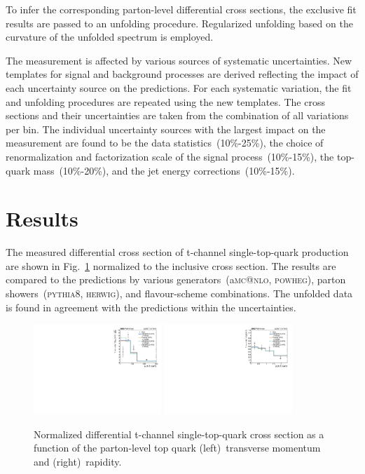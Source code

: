 \documentclass[12pt]{article}
\begin{document}
To infer the corresponding parton-level differential cross sections, the exclusive fit results are passed to an unfolding procedure. Regularized unfolding based on the curvature of the unfolded spectrum is employed. 

The measurement is affected by various sources of systematic uncertainties. New templates for signal and background processes are derived reflecting the impact of each uncertainty source on the predictions. For each systematic variation, the fit and unfolding procedures are repeated using the new templates. The cross sections and their uncertainties are taken from the combination of all variations per bin. The individual uncertainty sources with the largest impact on the measurement are found to be the data statistics~(10\%-25\%), the choice of renormalization and factorization scale of the signal process~(10\%-15\%), the top-quark mass~(10\%-20\%), and the jet energy corrections~(10\%-15\%).

\section{Results}

The measured differential cross section of t-channel single-top-quark production are shown in Fig.~\ref{fig:result} normalized to the inclusive cross section. The results are compared to the predictions by various generators~(a\textsc{mc@nlo}, \textsc{powheg}), parton showers~(\textsc{pythia}8, \textsc{herwig}), and flavour-scheme combinations. The unfolded data is found in agreement with the predictions within the uncertainties.

\begin{figure}[!htbp]
\begin{center}
\includegraphics[width=0.43\textwidth]{unfolded_top_pt.pdf}\hspace{0.05\textwidth}
\includegraphics[width=0.43\textwidth]{unfolded_top_y.pdf}
\end{center}

\caption{\label{fig:result}Normalized differential t-channel single-top-quark cross section as a function of the parton-level top quark (left)~transverse momentum and (right)~rapidity.}
\end{figure}
\end{document}
